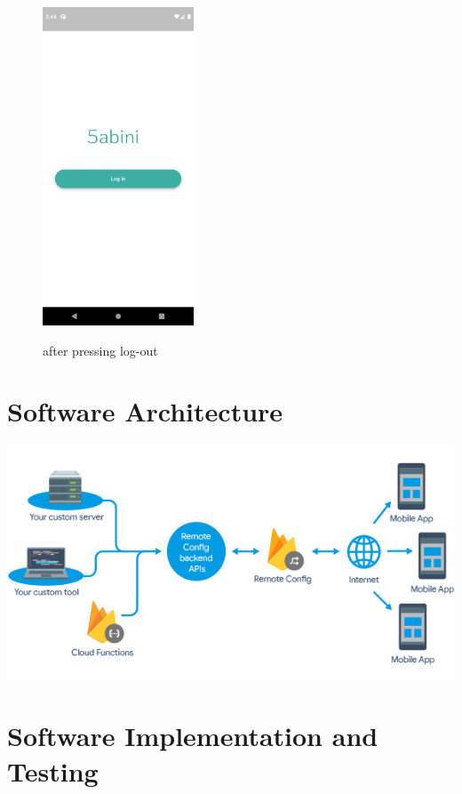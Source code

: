\documentclass[12pt]{article}
\begin{document}
    \begin{figure}[h!]
{\includegraphics[width=0.4\textwidth]{./Screenshots/1.PNG}}
  \caption{after pressing log-out}
  \end{figure}
  
  \onecolumn
  \clearpage
\section{Software Architecture}
{\includegraphics[width=1.1\textwidth]{./SoftwareArch/SoftwareArch.PNG}}
\sectionbreak
  \clearpage
\section{Software Implementation and Testing}
\end{document}
